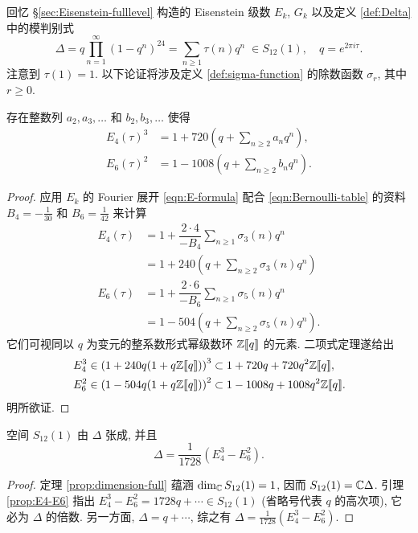 回忆 \S\ref{sec:Eisenstein-fulllevel} 构造的 Eisenstein 级数 $E_k$, $G_k$ 以及定义 \ref{def:Delta} 中的模判别式
\[ \Delta = q \prod_{n=1}^\infty (1-q^n)^{24} = \sum_{n \geq 1} \tau(n) q^n \; \in S_{12}(1), \quad q = e^{2\pi i\tau}. \]
注意到 $\tau(1) = 1$. 以下论证将涉及定义 \ref{def:sigma-function} 的除数函数 $\sigma_r$, 其中 $r \geq 0$.

\begin{lemma}\label{prop:E4-E6}
	存在整数列 $a_2, a_3, \ldots$ 和 $b_2, b_3, \ldots$ 使得
	\begin{align*}
		E_4(\tau)^3 & = 1 + 720\left( q + \sum_{n \geq 2} a_n q^n \right), \\
		E_6(\tau)^2 & = 1 - 1008\left( q + \sum_{n \geq 2} b_n q^n \right).
	\end{align*}
\end{lemma}
\begin{proof}
	应用 $E_k$ 的 Fourier 展开 \eqref{eqn:E-formula}	配合 \eqref{eqn:Bernoulli-table} 的资料 $B_4 = -\frac{1}{30}$ 和 $B_6 = \frac{1}{42}$ 来计算
	\begin{equation*}\begin{aligned}
		E_4(\tau) & = 1 + \dfrac{2 \cdot 4}{-B_4} \sum_{n \geq 1} \sigma_3(n) q^n \\
		& = 1 + 240 \left( q + \sum_{n \geq 2} \sigma_3(n) q^n \right) \\
		E_6(\tau) & = 1 + \dfrac{2 \cdot 6}{-B_6} \sum_{n \geq 1} \sigma_5(n) q^n \\
		& = 1 - 504 \left( q + \sum_{n \geq 2} \sigma_5(n) q^n \right).
	\end{aligned}\end{equation*}
	它们可视同以 $q$ 为变元的整系数形式幂级数环 $\mathbb{Z}\llbracket q \rrbracket$ 的元素. 二项式定理遂给出
	\begin{align*}
		E_4^3 & \in \left( 1 + 240 q (1+q\mathbb{Z}\llbracket q \rrbracket) \right)^3 \subset 1 + 720 q + 720 q^2 \mathbb{Z}\llbracket q \rrbracket, \\
		E_6^2 & \in \left( 1 - 504 q (1+q\mathbb{Z}\llbracket q \rrbracket) \right)^2 \subset 1 - 1008 q + 1008 q^2 \mathbb{Z}\llbracket q \rrbracket.
	\end{align*}
	明所欲证.
\end{proof}

\begin{corollary}\label{prop:Delta-Eisenstein}
	空间 $S_{12}(1)$ 由 $\Delta$ 张成, 并且
	\[ \Delta = \frac{1}{1728} \left( E_4^3 - E_6^2 \right). \]
\end{corollary}
\begin{proof}
	定理 \ref{prop:dimension-full} 蕴涵 $\dim_{\mathbb{C}} S_{12}(1) = 1$, 因而 $S_{12}(1) = \mathbb{C}\Delta$. 引理 \ref{prop:E4-E6} 指出 $E_4^3 - E_6^2 = 1728 q + \cdots \in S_{12}(1)$ (省略号代表 $q$ 的高次项), 它必为 $\Delta$ 的倍数. 另一方面, $\Delta = q + \cdots$, 综之有 $\Delta = \frac{1}{1728} \left( E_4^3 - E_6^2 \right)$.
\end{proof}

